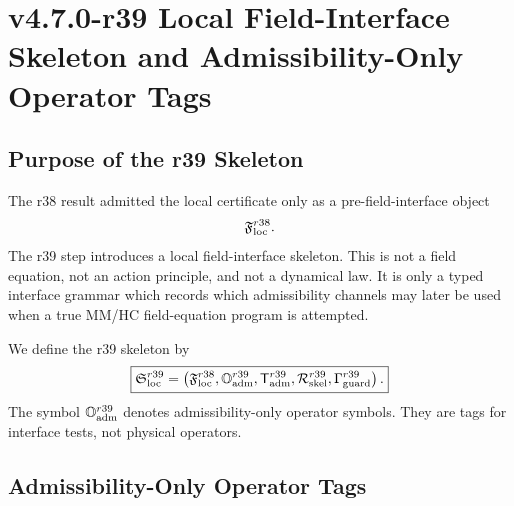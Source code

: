 \section{v4.7.0-r39 Local Field-Interface Skeleton and Admissibility-Only Operator Tags}
\label{sec:v470-r39-local-field-interface-skeleton}

\subsection{Purpose of the r39 Skeleton}
\label{subsec:r39-purpose}

The r38 result admitted the local certificate only as a pre-field-interface
object
\[
\mathfrak F_{\rm loc}^{r38}.
\]
The r39 step introduces a local field-interface skeleton.  This is not a field
equation, not an action principle, and not a dynamical law.  It is only a typed
interface grammar which records which admissibility channels may later be used
when a true MM/HC field-equation program is attempted.

We define the r39 skeleton by
\[
\boxed{
\mathfrak S_{\rm loc}^{r39}
=
\left(
\mathfrak F_{\rm loc}^{r38},
\mathbb O_{\rm adm}^{r39},
\mathsf T_{\rm adm}^{r39},
\mathcal R_{\rm skel}^{r39},
\Gamma_{\rm guard}^{r39}
\right).
}
\]
The symbol \(\mathbb O_{\rm adm}^{r39}\) denotes admissibility-only operator
symbols.  They are tags for interface tests, not physical operators.

\subsection{Admissibility-Only Operator Tags}
\label{subsec:r39-admissibility-only-operator-tags}

